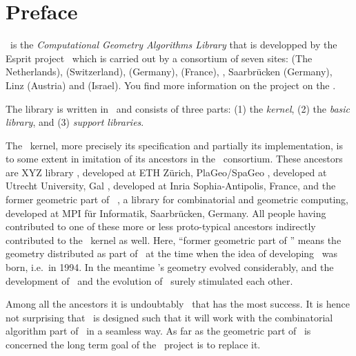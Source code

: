 \cleardoublepage
\chapter*{Preface}


\cgal\ is the {\em Computational Geometry Algorithms Library} that is
developped by the {\sc Esprit} project \cgal\  which is carried out by
a consortium of seven sites: 
 (The Netherlands), 
 (Switzerland), 
 (Germany), 
 (France),
,
Saarbr\"ucken (Germany),
 Linz (Austria) and 
 (Israel).
You find more information on the project on the 
.

The library is written in \CC\ and consists of three parts: (1) the
{\em kernel}, (2) the {\em basic library}, and (3) {\em support libraries}.

\medskip
The \cgal\ kernel, more precisely its specification and partially
its implementation, is to some extent in imitation of its ancestors
in the \cgal\ consortium.
These ancestors are XYZ library \cite{XYZ}, developed at ETH Z\"urich, 
PlaGeo/SpaGeo \cite{PlaGeo}, developed at Utrecht University, 
{\sc \CC Gal} \cite{Protocgal}, developed at {\sc Inria} Sophia-Antipolis, France,
and the former geometric part of 
~\cite{leda-manual}, a library for 
combinatorial and geometric computing, developed at MPI f\"ur 
Informatik, Saarbr\"ucken, Germany.
All people having contributed to one of these more or less 
proto-typical ancestors indirectly contributed to the \cgal\ kernel
as well.
Here, ``former geometric part of \leda'' means the geometry distributed
as part of \leda\ at the time when the idea of developing \cgal\ was born,
i.e.\ in 1994.
In the meantime \leda's geometry evolved considerably, and the 
development of \cgal\ and the evolution of \leda\ surely stimulated
each other.

\medskip
Among all the ancestors it is undoubtably \leda\ that has the most
success. It is hence not surprising that \cgal\ is designed such
that it will work with the combinatorial algorithm part of \leda\ in a
seamless way. As far as the geometric part of \leda\ is concerned
the long term goal of the \cgal\ project is to replace it.

